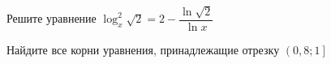 \begin{ex}
	\begin{condition}
		\begin{enumcols}[label=\asbuk*)]
			\item Решите уравнение \( \log_x^ 2 \sqrt{2} = 2 - \dfrac{\ln \sqrt{2}}{\ln x}  \)
			\item Найдите все корни уравнения, принадлежащие отрезку \( \left(0,8;1\right] \)
		\end{enumcols}
	\end{condition}
\end{ex}